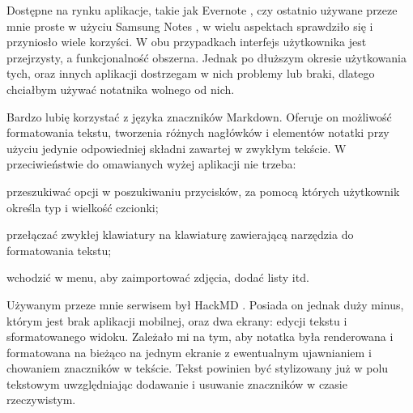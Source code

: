 \documentclass[shortabstract]{iithesis}
\begin{document}
Dostępne na rynku aplikacje, takie jak Evernote \cite{evernote}, czy ostatnio używane przeze mnie proste w użyciu Samsung Notes \cite{samsungNotes}, w wielu aspektach sprawdziło się i przyniosło wiele korzyści. W obu przypadkach interfejs użytkownika jest przejrzysty, a funkcjonalność obszerna. Jednak po dłuższym okresie użytkowania tych, oraz innych aplikacji dostrzegam w nich problemy lub braki, dlatego chciałbym używać notatnika wolnego od nich.

Bardzo lubię korzystać z języka znaczników Markdown. Oferuje on możliwość formatowania tekstu, tworzenia różnych nagłówków i elementów notatki przy użyciu jedynie odpowiedniej składni zawartej w zwykłym tekście. W przeciwieństwie do omawianych wyżej aplikacji nie trzeba:
\begin{compactitem}
    \item przeszukiwać opcji w poszukiwaniu przycisków, za pomocą których użytkownik określa typ i wielkość czcionki;
    \item przełączać zwykłej klawiatury na klawiaturę zawierającą narzędzia do formatowania tekstu;
    \item wchodzić w menu, aby zaimportować zdjęcia, dodać listy itd.
\end{compactitem} 
Używanym przeze mnie serwisem był HackMD \cite{hackmd}. Posiada on jednak duży minus, którym jest brak aplikacji mobilnej, oraz dwa ekrany: edycji tekstu i sformatowanego widoku. Zależało mi na tym, aby notatka była renderowana i formatowana na bieżąco na jednym ekranie z ewentualnym ujawnianiem i chowaniem znaczników w tekście. Tekst powinien być stylizowany już w polu tekstowym uwzględniając dodawanie i usuwanie znaczników w czasie rzeczywistym.
\end{document}
